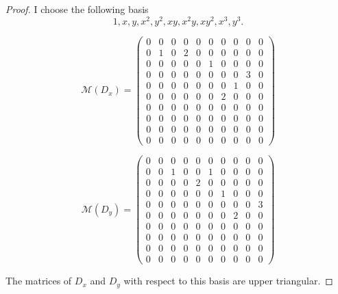 \begin{proof}
    I choose the following basis
    \[
        1, x, y, x^{2}, y^{2}, xy, x^{2}y, xy^{2}, x^{3}, y^{3}.
    \]

    \[
        \mathcal{M}(D_{x}) = \begin{pmatrix}
            0 & 0 & 0 & 0 & 0 & 0 & 0 & 0 & 0 & 0 \\
            0 & 1 & 0 & 2 & 0 & 0 & 0 & 0 & 0 & 0 \\
            0 & 0 & 0 & 0 & 0 & 1 & 0 & 0 & 0 & 0 \\
            0 & 0 & 0 & 0 & 0 & 0 & 0 & 0 & 3 & 0 \\
            0 & 0 & 0 & 0 & 0 & 0 & 0 & 1 & 0 & 0 \\
            0 & 0 & 0 & 0 & 0 & 0 & 2 & 0 & 0 & 0 \\
            0 & 0 & 0 & 0 & 0 & 0 & 0 & 0 & 0 & 0 \\
            0 & 0 & 0 & 0 & 0 & 0 & 0 & 0 & 0 & 0 \\
            0 & 0 & 0 & 0 & 0 & 0 & 0 & 0 & 0 & 0 \\
            0 & 0 & 0 & 0 & 0 & 0 & 0 & 0 & 0 & 0
        \end{pmatrix}
    \]

    \[
        \mathcal{M}(D_{y}) = \begin{pmatrix}
            0 & 0 & 0 & 0 & 0 & 0 & 0 & 0 & 0 & 0 \\
            0 & 0 & 1 & 0 & 0 & 1 & 0 & 0 & 0 & 0 \\
            0 & 0 & 0 & 0 & 2 & 0 & 0 & 0 & 0 & 0 \\
            0 & 0 & 0 & 0 & 0 & 0 & 1 & 0 & 0 & 0 \\
            0 & 0 & 0 & 0 & 0 & 0 & 0 & 0 & 0 & 3 \\
            0 & 0 & 0 & 0 & 0 & 0 & 0 & 2 & 0 & 0 \\
            0 & 0 & 0 & 0 & 0 & 0 & 0 & 0 & 0 & 0 \\
            0 & 0 & 0 & 0 & 0 & 0 & 0 & 0 & 0 & 0 \\
            0 & 0 & 0 & 0 & 0 & 0 & 0 & 0 & 0 & 0 \\
            0 & 0 & 0 & 0 & 0 & 0 & 0 & 0 & 0 & 0
        \end{pmatrix}
    \]

    The matrices of $D_{x}$ and $D_{y}$ with respect to this basis are upper triangular.
\end{proof}
\newpage

